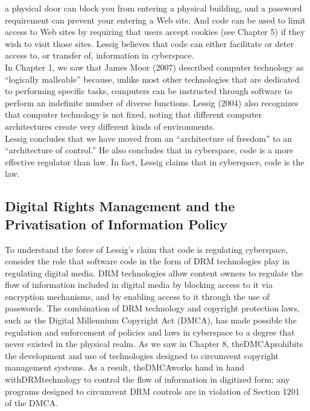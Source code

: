 \documentclass[12pt]{article}
\theoremstyle{definition}
\begin{document}
a physical door can block you from entering a physical building, and a password requirement
can prevent your entering a Web site. And code can be used to limit access to Web
sites by requiring that users accept cookies (see Chapter 5) if they wish to visit those sites.
Lessig believes that code can either facilitate or deter access to, or transfer of, information
in cyberspace.\\
In Chapter 1, we saw that James Moor (2007) described computer technology as
“logically malleable” because, unlike most other technologies that are dedicated to
performing specific tasks, computers can be instructed through software to perform an
indefinite number of diverse functions. Lessig (2004) also recognizes that computer technology is not fixed, noting that different computer architectures create very different
kinds of environments.\\
Lessig concludes that we have
moved from an “architecture of freedom” to an “architecture of control.” He also
concludes that in cyberspace, code is a more effective regulator than law. In fact, Lessig
claims that in cyberspace, code is the law.
\subsection{Digital Rights Management and the Privatisation of Information Policy}
To understand the force of Lessig’s claim that code is regulating cyberspace, consider the
role that software code in the form of DRM technologies play in regulating digital media.
DRM technologies allow content owners to regulate the flow of information included in
digital media by blocking access to it via encryption mechanisms, and by enabling access
to it through the use of passwords. The combination of DRM technology and copyright
protection laws, such as the Digital Millennium Copyright Act (DMCA), has made
possible the regulation and enforcement of policies and laws in cyberspace to a degree
that never existed in the physical realm. As we saw in Chapter 8, theDMCAprohibits the
development and use of technologies designed to circumvent copyright management
systems. As a result, theDMCAworks hand in hand withDRMtechnology to control the
flow of information in digitized form; any programs designed to circumvent DRM
controls are in violation of Section 1201 of the DMCA.
\end{document}
